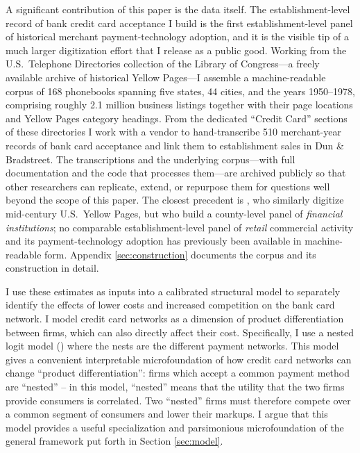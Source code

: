 \documentclass[12pt,english]{article}
\begin{document}
A significant contribution of this paper is the data itself. The establishment-level record of bank credit card acceptance I build is the first establishment-level panel of historical merchant payment-technology adoption, and it is the visible tip of a much larger digitization effort that I release as a public good. Working from the U.S.\ Telephone Directories collection of the Library of Congress---a freely available archive of historical Yellow Pages---I assemble a machine-readable corpus of 168 phonebooks spanning five states, 44 cities, and the years 1950--1978, comprising roughly 2.1 million business listings together with their page locations and Yellow Pages category headings. From the dedicated ``Credit Card'' sections of these directories I work with a vendor to hand-transcribe 510 merchant-year records of bank card acceptance and link them to establishment sales in Dun \& Bradstreet. The transcriptions and the underlying corpus---with full documentation and the code that processes them---are archived publicly so that other researchers can replicate, extend, or repurpose them for questions well beyond the scope of this paper. The closest precedent is \cite{begley_shadows_2023}, who similarly digitize mid-century U.S.\ Yellow Pages, but who build a county-level panel of \emph{financial institutions}; no comparable establishment-level panel of \emph{retail} commercial activity and its payment-technology adoption has previously been available in machine-readable form. Appendix \ref{sec:construction} documents the corpus and its construction in detail.

I use these estimates as inputs into a calibrated structural model to separately identify the effects of lower costs and increased competition on the bank card network. I model credit card networks as a dimension of product differentiation between firms, which can also directly affect their cost. Specifically, I use a nested logit model (\cite{atalay_scalable_2023}) where the nests are the different payment networks. This model gives a convenient interpretable microfoundation of how credit card networks can change ``product differentiation'': firms which accept a common payment method are ``nested'' -- in this model, ``nested'' means that the utility that the two firms provide consumers is correlated. Two ``nested'' firms must therefore compete over a common segment of consumers and lower their markups. I argue that this model provides a useful specialization and parsimonious microfoundation of the general framework put forth in Section \ref{sec:model}.
\end{document}
